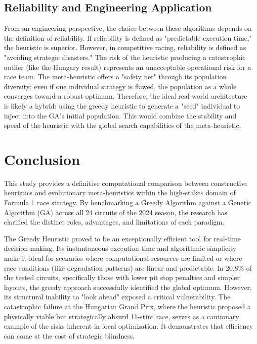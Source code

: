 \documentclass[10pt]{article}
\begin{document}
\subsection{Reliability and Engineering Application}

From an engineering perspective, the choice between these algorithms depends on the definition of reliability.
If reliability is defined as "predictable execution time," the heuristic is superior.
However, in competitive racing, reliability is defined as "avoiding strategic disasters."
The risk of the heuristic producing a catastrophic outlier (like the Hungary result) represents an unacceptable operational risk for a race team.
The meta-heuristic offers a "safety net" through its population diversity; even if one individual strategy is flawed, the population as a whole converges toward a robust optimum.
Therefore, the ideal real-world architecture is likely a hybrid: using the greedy heuristic to generate a "seed" individual to inject into the GA's initial population.
This would combine the stability and speed of the heuristic with the global search capabilities of the meta-heuristic.

\section{Conclusion}

This study provides a definitive computational comparison between constructive heuristics and evolutionary meta-heuristics within the high-stakes domain of Formula 1 race strategy.
By benchmarking a Greedy Algorithm against a Genetic Algorithm (GA) across all 24 circuits of the 2024 season, the research has clarified the distinct roles, advantages, and limitations of each paradigm.

The Greedy Heuristic proved to be an exceptionally efficient tool for real-time decision-making.
Its instantaneous execution time and algorithmic simplicity make it ideal for scenarios where computational resources are limited or where race conditions (like degradation patterns) are linear and predictable.
In 20.8\% of the tested circuits, specifically those with lower pit stop penalties and simpler layouts, the greedy approach successfully identified the global optimum.
However, its structural inability to "look ahead" exposed a critical vulnerability.
The catastrophic failure at the Hungarian Grand Prix, where the heuristic proposed a physically viable but strategically absurd 11-stint race, serves as a cautionary example of the risks inherent in local optimization.
It demonstrates that efficiency can come at the cost of strategic blindness.
\end{document}
